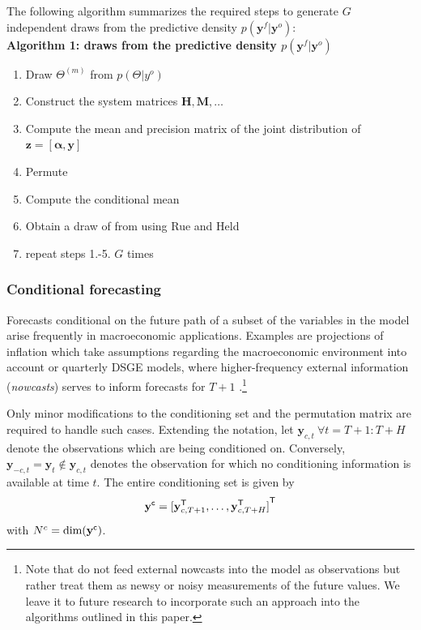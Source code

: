 \documentclass[notitlepage,a4paper,12pt]{article}
\newcommand{\transpose}[1]{{#1}^{\sf{T}}}
\begin{document}
The following algorithm summarizes the required steps to generate $G$ independent draws from the predictive density $p(\mathbf{y}^f | \mathbf{y}^o)$:\\

 \noindent\textbf{Algorithm 1: draws from the predictive density $p(\mathbf{y}^f | \mathbf{y}^o)$}\\

\begin{enumerate}
    \item Draw $\Theta^{(m)}$ from $p(\Theta | y^o)$
    \item Construct the system matrices $\mathbf{H}, \mathbf{M}, \dots$
    \item Compute the mean and precision matrix of the joint distribution of $\mathbf{z} = [\boldsymbol{\alpha}, \mathbf{y}]$  
    \item Permute 
    \item Compute the conditional mean
    \item Obtain a draw of from using Rue and Held
    \item repeat steps 1.-5. $G$ times
\end{enumerate}

\subsubsection{Conditional forecasting}\label{sec:condfcast}

Forecasts conditional on the future path of a subset of the variables in the model arise frequently in macroeconomic applications. Examples are projections of inflation which take assumptions regarding the macroeconomic environment into account \citep{giannone_etal_2014_ijf} or quarterly DSGE models, where higher-frequency external information (\textit{nowcasts}) serves to inform forecasts for $T+1$ \citep{delnegro_schorfheide_2013_hb}.\footnote{Note that \citet{delnegro_schorfheide_2013_hb} do not feed external nowcasts into the model as observations but rather treat them as newsy or noisy measurements of the future values. We leave it to future research to incorporate such an approach into the algorithms outlined in this paper.}

Only minor modifications to the conditioning set and the permutation matrix are required to handle such cases. Extending the notation, let $\mathbf{y}_{c,t}\: \forall t = T+1:T+H$ denote the observations which are being conditioned on. Conversely, $\mathbf{y}_{-c,t} = \mathbf{y}_t\notin\mathbf{y}_{c,t}$ denotes the observation for which no conditioning information is available at time $t$. The entire conditioning set is given by 
$$
\mathbf{y}^{\sf{c}} = \transpose{[\mathbf{y}^{\sf{T}}_{c,T+1}, \dots, \mathbf{y}^{\sf{T}}_{c,T+H}]}
$$ 
with $N^c = \text{dim}(\mathbf{y}^{\sf{c}})$.
\end{document}
